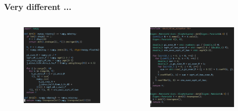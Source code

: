 \documentclass[dvipsnames, 10pt, table]{beamer}
\begin{document}
\begin{frame}[fragile]
  \frametitle{Very different ...}
  \begin{columns}
    \begin{column}{0.5\textwidth}
      \begin{figure}
        \begin{center}
          \includegraphics[width=1.0\textwidth]{figures/solution/code-python.png}
        \end{center}
      \end{figure}
    \end{column}
    \begin{column}{0.5\textwidth}
      \begin{figure}
        \begin{center}
          \includegraphics[width=1.0\textwidth]{figures/solution/code-cpp.png}

\end{center}
\end{figure}
\end{column}
\end{columns}
\end{frame}
\end{document}
